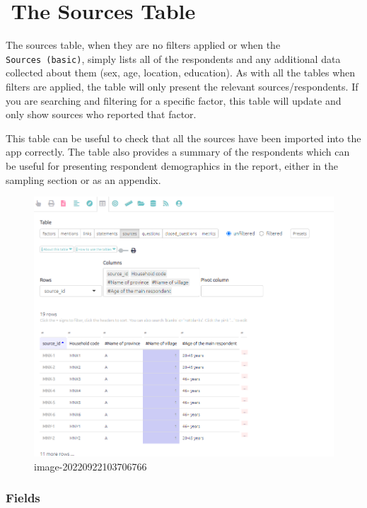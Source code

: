 \documentclass[
]{book}
\begin{document}
\hypertarget{the-sources-table}{%
\chapter{🧪The Sources Table}\label{the-sources-table}}

The sources table, when they are no filters applied or when the \texttt{Sources\ (basic)}, simply lists all of the respondents and any additional data collected about them (sex, age, location, education). As with all the tables when filters are applied, the table will only present the relevant sources/respondents. If you are searching and filtering for a specific factor, this table will update and only show sources who reported that factor.

This table can be useful to check that all the sources have been imported into the app correctly. The table also provides a summary of the respondents which can be useful for presenting respondent demographics in the report, either in the sampling section or as an appendix.

\begin{figure}
\centering
\includegraphics[width=6.77083in,height=\textheight]{_assets/image-20220922103706766.png}
\caption{image-20220922103706766}
\end{figure}

\hypertarget{fields-6}{%
\subsection{Fields}\label{fields-6}}
\end{document}
